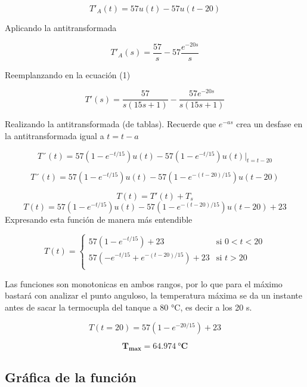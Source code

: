 \documentclass[
  letterpaper,
  DIV=11,
  numbers=noendperiod]{scrreprt}
\begin{document}
\[
T'_A(t)=57u(t)-57u(t-20)
\]

Aplicando la antitransformada

\[
T'_A(s)= \frac{57}{s}-57\frac{e^{-20s}}{s}
\]

Reemplanzando en la ecuación (1)

\[
T'(s)=\frac{57}{s(15 s+1)}-\frac{57e^{-20s}}{s(15 s+1)}
\]

Realizando la antitransformada (de tablas). Recuerde que \(e^{-as}\)
crea un desfase en la antitransformada igual a \(t= t-a\)

\[
T´(t)=57(1-e^{-t/15})u(t)-57(1-e^{-t/15})u(t)|_{t=t-20}
\]

\[
T´(t)=57(1-e^{-t/15})u(t)-57(1-e^{-(t-20)/15})u(t-20)
\]

\[
T(t)=T'(t)+T_s
\] \[
T(t)=57(1-e^{-t/15})u(t)-57(1-e^{-(t-20)/15})u(t-20)+23
\] Expresando esta función de manera más entendible

\[
T(t)= 
\begin{cases}
   57(1-e^{-t/15})+23 &\text{si  } 0<t< 20 \\
   57(-e^{-t/15}+e^{-(t-20)/15})+23 &\text{si  } t > 20\\
\end{cases}
\]

Las funciones son monotonicas en ambos rangos, por lo que para el máximo
bastará con analizar el punto anguloso, la temperatura máxima se da un
instante antes de sacar la termocupla del tanque a 80 °C, es decir a los
20 s.

\[
T(t=20)=57(1-e^{-20/15})+23
\]

\[
\mathbf{T_{max}=64.974\ °C}
\]

\hypertarget{gruxe1fica-de-la-funciuxf3n}{%
\subsection{Gráfica de la función}\label{gruxe1fica-de-la-funciuxf3n}}
\end{document}
